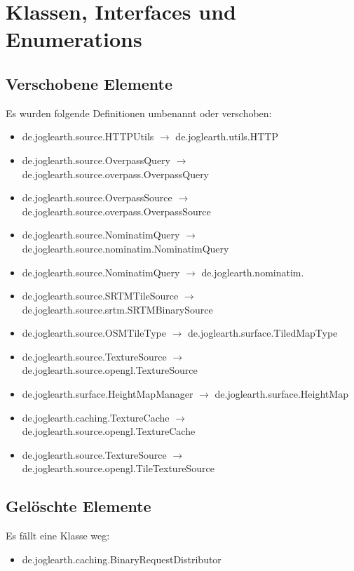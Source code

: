 \documentclass[10pt]{scrreprt}
\begin{document}
\section{Klassen, Interfaces und Enumerations}

\subsection*{Verschobene Elemente}
Es wurden folgende Definitionen umbenannt oder verschoben:

\begin{itemize}
\item de.joglearth.source.HTTPUtils $ \rightarrow $ de.joglearth.utils.HTTP
\item de.joglearth.source.OverpassQuery $ \rightarrow $ de.joglearth.source.overpass.OverpassQuery
\item de.joglearth.source.OverpassSource $ \rightarrow $ de.joglearth.source.overpass.OverpassSource
\item de.joglearth.source.NominatimQuery $ \rightarrow $ de.joglearth.source.nominatim.NominatimQuery
\item de.joglearth.source.NominatimQuery $ \rightarrow $ de.joglearth.nominatim.
\item de.joglearth.source.SRTMTileSource $ \rightarrow $ de.joglearth.source.srtm.SRTMBinarySource
\item de.joglearth.source.OSMTileType $ \rightarrow $ de.joglearth.surface.TiledMapType
\item de.joglearth.source.TextureSource $ \rightarrow $ de.joglearth.source.opengl.TextureSource
\item de.joglearth.surface.HeightMapManager $ \rightarrow $ de.joglearth.surface.HeightMap
\item de.joglearth.caching.TextureCache $ \rightarrow $ de.joglearth.source.opengl.TextureCache
\item de.joglearth.source.TextureSource $ \rightarrow $ de.joglearth.source.opengl.TileTextureSource
\end{itemize}

\subsection*{Gelöschte Elemente}
Es fällt eine Klasse weg:

\begin{itemize}
\item de.joglearth.caching.BinaryRequestDistributor
\end{itemize}
\end{document}
